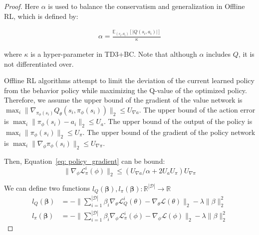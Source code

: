 \begin{proof}
Here $\alpha$ is used to balance the conservatism and generalization in Offline RL, which is defined by:

\begin{align}
    \alpha= \frac{\mathbb{E}_{(s_i,a_i)}[|Q(s_i,a_i)|]}{\kappa}
\end{align}

where $\kappa$ is a hyper-parameter in TD3+BC.
Note that although $\alpha$ includes $Q$, it is not differentiated over. 

Offline RL algorithms attempt to limit the deviation of the current learned policy from the behavior policy while maximizing the Q-value of the optimized policy.
Therefore, we assume the upper bound of the gradient of the value network is $\max_i\|\nabla_{\pi_{\phi}(s_i)}Q_\theta(s_i,\pi_{\phi}(s_i))\|_2 \leq U_{\nabla a}$.
The upper bound of the action error is $\max_i\|\pi_{\phi}(s_i)-a_i\|_2\leq U_a$.
The upper bound of the output of the policy is $\max_i\|\pi_{\phi}(s_i)\|_2 \leq U_\pi$.
The upper bound of the gradient of the policy network is
$\max_i\|\nabla_\phi \pi_{\phi}(s_i)\|_2\leq U_{\nabla \pi}$.

Then, Equation~\ref{eq: policy_gradient} can be bound:
\begin{equation}
    \|\nabla_\phi \mathcal L_{\pi}^i(\phi)\|_2 \leq (U_{\nabla a}/\alpha+2U_a U_\pi)U_{\nabla \pi}
\end{equation}

We can define two functions $l_Q(\mathbf{\beta}), l_\pi(\mathbf{\beta}): \mathbb{R}^{|\mathcal{D}|} \rightarrow \mathbb{R}$
\begin{equation}
\begin{aligned}
    l_Q(\mathbf{\beta}) &= -\|\sum_{i=1}^{{|\mathcal{D}|}} \beta_i\nabla_\theta \mathcal L_Q^i(\theta)-\nabla_\theta \mathcal L(\theta)\|_2 - \lambda\|\beta\|_2^2 \\
    l_\pi(\mathbf{\beta}) &= -\|\sum_{i=1}^{{|\mathcal{D}|}} \beta_i\nabla_\phi \mathcal L^i_\pi(\phi)-\nabla_\phi \mathcal L(\phi)\|_2 - \lambda\|\beta\|_2^2
\end{aligned}
\end{equation}


\end{proof}
